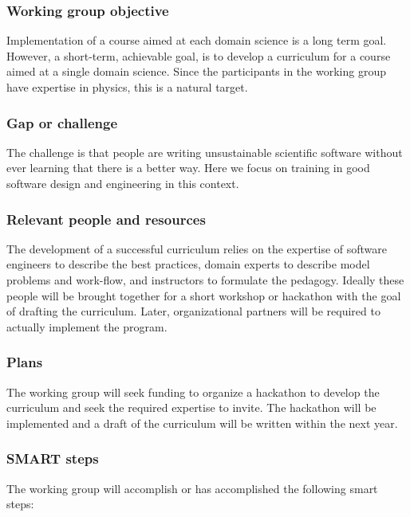 \subsubsection{Working group objective}

Implementation of a course aimed at each domain science is a long term
goal. However, a short-term, achievable goal, is to develop a
curriculum for a course aimed at a single domain science. Since the
participants in the working group have expertise in physics, this is a
natural target.

\subsubsection{Gap or challenge}

The challenge is that people are writing unsustainable scientific
software without ever learning that there is a better way. Here we
focus on training in good software design and engineering in this
context.

\subsubsection{Relevant people and resources}

The development of a successful curriculum relies on the expertise of
software engineers to describe the best practices, domain experts to
describe model problems and work-flow, and instructors to formulate
the pedagogy. Ideally these people will be brought together for a
short workshop or hackathon with the goal of drafting the
curriculum. Later, organizational partners will be required to
actually implement the program.

\subsubsection{Plans}

The working group will seek funding to organize a hackathon to develop
the curriculum and seek the required expertise to invite. The
hackathon will be implemented and a draft of the curriculum will be
written within the next year.

\subsubsection{SMART steps}

The working group will accomplish or has accomplished the following
smart steps:

